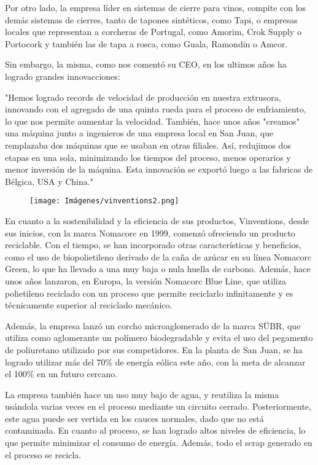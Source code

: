 Por otro lado, la empresa líder en sistemas de cierre para vinos, compite con los demás sistemas de cierres, tanto de tapones sintéticos, como Tapi, o empresas locales que representan a corcheras de Portugal, como Amorim, Crok Supply o Portocork y también las de tapa a rosca, como Guala, Ramondin o Amcor.

Sin embargo, la misma, como nos comentó  su CEO, en los ultimos años ha logrado grandes innovacciones:

"Hemos logrado records de velocidad de producción en nuestra extrusora, innovando con el agregado de una quinta rueda para el proceso de enfriamiento, lo que nos permite aumentar la velocidad. También, hace unos años "creamos" una máquina junto a ingenieros de una empresa local en San Juan, que remplazaba dos máquinas que se usaban en otras filiales. Así, redujimos dos etapas en una sola, minimizando los tiempos del proceso, menos operarios y menor inversión de la máquina. Esta innovación se exportó luego a las fabricas de Bélgica, USA y China."
\begin{figure}[h]
    \centering
    \texttt{[image: Imágenes/vinventions2.png]}
\end{figure}

En cuanto a la sostenibilidad y la eficiencia de sus productos, Vinventions, desde sus inicios, con la marca Nomacorc en 1999, comenzó ofreciendo un producto reciclable. Con el tiempo, se han incorporado otras características y beneficios, como el uso de biopolietileno derivado de la caña de azúcar en su línea Nomacorc Green, lo que ha llevado a una muy baja o nula huella de carbono. Además, hace unos años lanzaron, en Europa, la versión Nomacorc Blue Line, que utiliza polietileno reciclado con un proceso que permite reciclarlo infinitamente y es técnicamente superior al reciclado mecánico.

Además, la empresa lanzó un corcho microaglomerado de la marca SÜBR, que utiliza como aglomerante un polímero biodegradable y evita el uso del pegamento de poliuretano utilizado por sus competidores. En la planta de San Juan, se ha logrado utilizar más del 70\% de energía eólica este año, con la meta de alcanzar el 100\% en un futuro cercano.

La empresa también hace un uso muy bajo de agua, y reutiliza la misma usándola varias veces en el proceso mediante un circuito cerrado. Posteriormente, este agua puede ser vertida en los cauces normales, dado que no está contaminada. En cuanto al proceso, se han logrado altos niveles de eficiencia, lo que permite minimizar el consumo de energía. Además, todo el scrap generado en el proceso se recicla.

